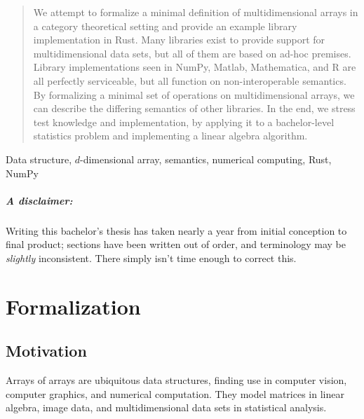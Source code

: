 \documentclass{DIKU-report-variant}
\begin{document}
\maketitle

\begin{abstract}
  We attempt to formalize a minimal definition of multidimensional arrays
  in a category theoretical setting and provide an example library implementation in Rust.
  Many libraries exist to provide support for multidimensional data sets, but all
  of them are based on ad-hoc premises.
  Library implementations seen in NumPy, Matlab, Mathematica, and R are all
  perfectly serviceable, but all function on non-interoperable semantics.
  By formalizing a minimal set of operations on multidimensional arrays, we can
  describe the differing semantics of other libraries.
  In the end, we stress test knowledge and implementation, by applying it to
  a bachelor-level statistics problem and implementing a linear algebra algorithm.
\end{abstract}

\begin{keywords}
  Data structure, \(d\)-dimensional array, semantics, numerical computing, Rust, NumPy
\end{keywords}

\vfill

\paragraph{A disclaimer:} Writing this bachelor's thesis has taken nearly a year from
initial conception to final product; sections have been written out of order, and terminology
may be \textsl{slightly} inconsistent. There simply isn't time enough to correct this.

\setcounter{tocdepth}{2}
\tableofcontents


\chapter{Formalization}

\section{Motivation}

Arrays of arrays are ubiquitous data structures, finding use
in computer vision, computer graphics, and numerical computation.
They model matrices in linear algebra, image data, and multidimensional data sets in statistical analysis.
\end{document}
